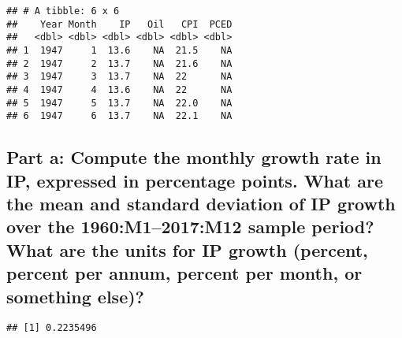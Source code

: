 \documentclass[
]{article}
\newenvironment{Shaded}{\begin{snugshade}}{\end{snugshade}}
\newcommand{\AttributeTok}[1]{\textcolor[rgb]{0.13,0.29,0.53}{#1}}
\newcommand{\DecValTok}[1]{\textcolor[rgb]{0.00,0.00,0.81}{#1}}
\newcommand{\FunctionTok}[1]{\textcolor[rgb]{0.13,0.29,0.53}{\textbf{#1}}}
\newcommand{\NormalTok}[1]{#1}
\newcommand{\OtherTok}[1]{\textcolor[rgb]{0.56,0.35,0.01}{#1}}
\newcommand{\SpecialCharTok}[1]{\textcolor[rgb]{0.81,0.36,0.00}{\textbf{#1}}}
\begin{document}
\begin{verbatim}
## # A tibble: 6 x 6
##    Year Month    IP   Oil   CPI  PCED
##   <dbl> <dbl> <dbl> <dbl> <dbl> <dbl>
## 1  1947     1  13.6    NA  21.5    NA
## 2  1947     2  13.7    NA  21.6    NA
## 3  1947     3  13.7    NA  22      NA
## 4  1947     4  13.6    NA  22      NA
## 5  1947     5  13.7    NA  22.0    NA
## 6  1947     6  13.7    NA  22.1    NA
\end{verbatim}

\hypertarget{part-a-compute-the-monthly-growth-rate-in-ip-expressed-in-percentage-points.-what-are-the-mean-and-standard-deviation-of-ip-growth-over-the-1960m12017m12-sample-period-what-are-the-units-for-ip-growth-percent-percent-per-annum-percent-per-month-or-something-else}{%
\subsection{Part a: Compute the monthly growth rate in IP, expressed in
percentage points. What are the mean and standard deviation of IP growth
over the 1960:M1--2017:M12 sample period? What are the units for IP
growth (percent, percent per annum, percent per month, or something
else)?}\label{part-a-compute-the-monthly-growth-rate-in-ip-expressed-in-percentage-points.-what-are-the-mean-and-standard-deviation-of-ip-growth-over-the-1960m12017m12-sample-period-what-are-the-units-for-ip-growth-percent-percent-per-annum-percent-per-month-or-something-else}}

\begin{Shaded}
\end{Shaded}

\begin{verbatim}
## [1] 0.2235496
\end{verbatim}
\end{document}
